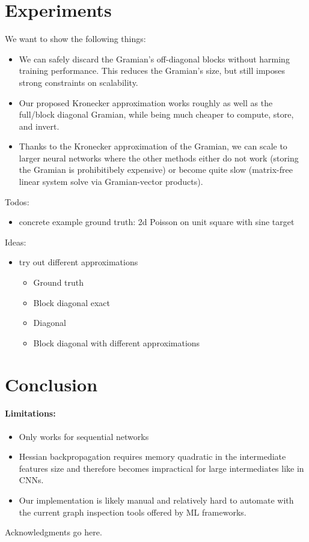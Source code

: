 \documentclass{article}
\begin{document}


\section{Experiments}

We want to show the following things:
\begin{itemize}
\item We can safely discard the Gramian's off-diagonal blocks without harming
  training performance. This reduces the Gramian's size, but still imposes
  strong constraints on scalability.

\item Our proposed Kronecker approximation works roughly as well as the
  full/block diagonal Gramian, while being much cheaper to compute, store, and
  invert.

\item Thanks to the Kronecker approximation of the Gramian, we can scale to larger neural networks where the other methods either do not work (storing the Gramian is prohibitibely expensive) or become quite slow (matrix-free linear system solve via Gramian-vector products).
\end{itemize}

Todos:
\begin{itemize}
\item concrete example ground truth: 2d Poisson on unit square with sine target
\end{itemize}

Ideas:
\begin{itemize}
\item try out different approximations
  \begin{itemize}
  \item Ground truth
  \item Block diagonal exact
  \item Diagonal
  \item Block diagonal with different approximations
  \end{itemize}
\end{itemize}

\section{Conclusion}

\paragraph{Limitations:}
\begin{itemize}
\item Only works for sequential networks
\item Hessian backpropagation requires memory quadratic in the intermediate features size and therefore becomes impractical for large intermediates like in CNNs.
\item Our implementation is likely manual and relatively hard to automate with the current graph inspection tools offered by ML frameworks.
\end{itemize}

\begin{ack} %
  Acknowledgments go here.
\end{ack}




\appendix



\end{document}
